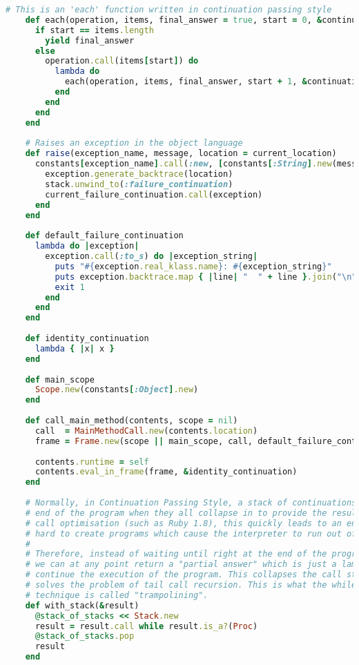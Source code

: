 \begin{lstlisting}[title={\small\ttfamily\bfseries runtime/runtime.rb},language=Ruby]
    # This is an 'each' function written in continuation passing style
    def each(operation, items, final_answer = true, start = 0, &continuation)
      if start == items.length
        yield final_answer
      else
        operation.call(items[start]) do
          lambda do
            each(operation, items, final_answer, start + 1, &continuation)
          end
        end
      end
    end
    
    # Raises an exception in the object language
    def raise(exception_name, message, location = current_location)
      constants[exception_name].call(:new, [constants[:String].new(message)]) do |exception|
        exception.generate_backtrace(location)
        stack.unwind_to(:failure_continuation)
        current_failure_continuation.call(exception)
      end
    end
    
    def default_failure_continuation
      lambda do |exception|
        exception.call(:to_s) do |exception_string|
          puts "#{exception.real_klass.name}: #{exception_string}"
          puts exception.backtrace.map { |line| "  " + line }.join("\n")
          exit 1
        end
      end
    end
    
    def identity_continuation
      lambda { |x| x }
    end
    
    def main_scope
      Scope.new(constants[:Object].new)
    end
    
    def call_main_method(contents, scope = nil)
      call  = MainMethodCall.new(contents.location)
      frame = Frame.new(scope || main_scope, call, default_failure_continuation)
      
      contents.runtime = self
      contents.eval_in_frame(frame, &identity_continuation)
    end
    
    # Normally, in Continuation Passing Style, a stack of continuations is built up right until the
    # end of the program when they all collapse in to provide the result. In languages without tail
    # call optimisation (such as Ruby 1.8), this quickly leads to an enormous stack, and it's not
    # hard to create programs which cause the interpreter to run out of stack space.
    # 
    # Therefore, instead of waiting until right at the end of the program to return the answer,
    # we can at any point return a "partial answer" which is just a lambda which can be called to
    # continue the execution of the program. This collapses the call stack right back down, so
    # solves the problem of tail call recursion. This is what the while loop is doing. This
    # technique is called "trampolining".
    def with_stack(&result)
      @stack_of_stacks << Stack.new
      result = result.call while result.is_a?(Proc)
      @stack_of_stacks.pop
      result
    end
    

\end{lstlisting}
